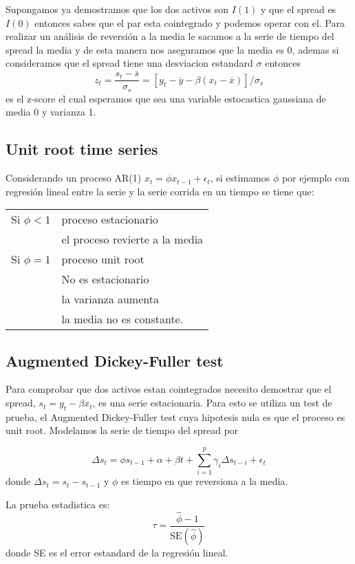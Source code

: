 \documentclass{myarticle}
\begin{document}
Supongamos ya demostramos que los dos activos son $I(1)$ y que el spread es $I(0)$ entonces sabes que el par esta cointegrado y podemos operar con el. Para realizar un an\'alisis de reversi\'on a la media  le sacamos a la serie de tiempo del spread la media y de esta manera nos aseguramos que la media es 0, ademas si consideramos que el spread tiene una desviacion estandard $\sigma$ entonces
\[
z_t = \frac{s_t - \overline s}{\sigma_s} = [y_{t}-\overline y - \beta (x_{t}-\overline x) ]/\sigma_s
\]
es el z-score el cual esperamos que sea una variable estocastica gaussiana de media 0 y varianza 1.


\subsection{Unit root time series}
\label{sec:org7e45d14}

Considerando un proceso AR(1) \(x_t = \phi x_{t-1} +\epsilon_t\), si estimamos \(\phi\) por ejemplo con regresi\'on lineal entre la serie y la serie corrida en un tiempo se tiene que:


\begin{tabular}{ll}
Si $\phi < 1$  & proceso estacionario\\
& el proceso revierte a la media \\
Si $\phi = 1 $ & proceso unit root \\
              & No es estacionario \\
              & la varianza aumenta \\
& la media no es constante.
\end{tabular}
\subsection{Augmented Dickey-Fuller test}
\label{sec:org8006b42}

Para comprobar que dos activos estan cointegrados necesito demostrar que el spread, \(s_t=y_t-\beta x_t\), es una serie estacionaria. Para esto se utiliza un test de prueba, el Augmented Dickey-Fuller test cuya hipotesis nula es que el proceso es unit root. Modelamos la serie de tiempo del spread por

\[ \Delta s_t =  \phi s_{t-1} + \alpha + \beta t + \sum_{i=1}^p \gamma_i \Delta s_{t-i} + \epsilon_t \]
donde \(\Delta s_t = s_t - s_{t-1}\) y $\phi$ es tiempo en que reversiona a la media.

La prueba estadistica es:
\[\tau = \frac{\hat{\phi} - 1}{\text{SE}(\hat{\phi})}\]
donde SE es el error estandard de la regresi\'on lineal.
\end{document}
